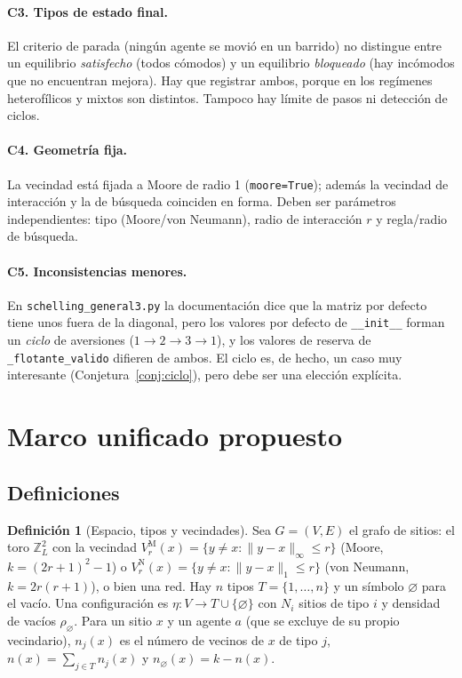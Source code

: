 \documentclass[11pt,a4paper]{article}
\theoremstyle{plain}
\theoremstyle{definition}
\newtheorem{definicion}{Definición}
\theoremstyle{remark}
\newcommand{\vac}{\varnothing}
\begin{document}
\paragraph{C3. Tipos de estado final.}
El criterio de parada (ningún agente se movió en un barrido) no distingue entre
un equilibrio \emph{satisfecho} (todos cómodos) y un equilibrio
\emph{bloqueado} (hay incómodos que no encuentran mejora). Hay que registrar
ambos, porque en los regímenes heterofílicos y mixtos son distintos. Tampoco hay
límite de pasos ni detección de ciclos.

\paragraph{C4. Geometría fija.}
La vecindad está fijada a Moore de radio 1 (\texttt{moore=True}); además la
vecindad de interacción y la de búsqueda coinciden en forma. Deben ser
parámetros independientes: tipo (Moore/von Neumann), radio de interacción $r$ y
regla/radio de búsqueda.

\paragraph{C5. Inconsistencias menores.}
En \texttt{schelling\_general3.py} la documentación dice que la matriz por
defecto tiene unos fuera de la diagonal, pero los valores por defecto de
\texttt{\_\_init\_\_} forman un \emph{ciclo} de aversiones
($1\to2\to3\to1$), y los valores de reserva de \texttt{\_flotante\_valido}
difieren de ambos. El ciclo es, de hecho, un caso muy interesante
(Conjetura~\ref{conj:ciclo}), pero debe ser una elección explícita.

\section{Marco unificado propuesto}
\label{sec:marco}

\subsection{Definiciones}

\begin{definicion}[Espacio, tipos y vecindades]
Sea $G=(V,E)$ el grafo de sitios: el toro $\mathbb{Z}_L^2$ con la vecindad
$V_r^{\mathrm M}(x)=\{y\neq x:\|y-x\|_\infty\le r\}$ (Moore, $k=(2r+1)^2-1$) o
$V_r^{\mathrm N}(x)=\{y\neq x:\|y-x\|_1\le r\}$ (von Neumann, $k=2r(r+1)$), o
bien una red. Hay $n$ tipos $T=\{1,\dots,n\}$ y un símbolo $\vac$ para el vacío.
Una configuración es $\eta:V\to T\cup\{\vac\}$ con $N_i$ sitios de tipo $i$ y
densidad de vacíos $\rho_\vac$. Para un sitio $x$ y un agente $a$ (que se excluye
de su propio vecindario), $n_j(x)$ es el número de vecinos de $x$ de tipo $j$,
$n(x)=\sum_{j\in T}n_j(x)$ y $n_\vac(x)=k-n(x)$.
\end{definicion}
\end{document}
